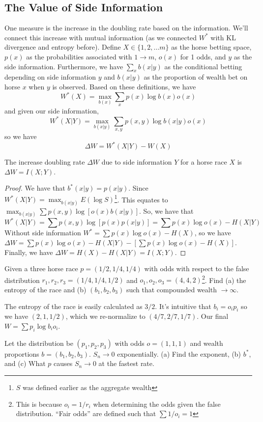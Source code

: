 \documentclass[11pt]{article}
\theoremstyle{definition}
\begin{document}
\subsection{The Value of Side Information}

One measure is the increase in the doubling rate based on the information. We'll connect this increase with mutual information (as we connected $W^*$ with KL divergence and entropy before). Define $X \in \{1, 2, \dots m \}$ as the horse betting space, $p(x)$ as the probabilities associated with $1 \rightarrow m$, $o(x)$ for 1 odds, and $y$ as the side information. Furthermore, we have $\sum_x b(x|y)$ as the conditional betting depending on side information $y$ and $b(x|y)$ as the proportion of wealth bet on horse $x$ when $y$ is observed. Based on these definitions, we have $$W^*(X) = \max_{b(x)} \sum_x p(x) \log b(x) o(x)$$and given our side information, $$W^*(X|Y) = \max_{b(x|y)} \sum_{x, y} p(x, y) \log b(x|y) o(x)$$so we have $$\Delta W = W^*(X|Y) - W(X)$$

\theorem The increase doubling rate $\Delta W$ due to side information $Y$ for a horse race $X$ is $\Delta W = I(X; Y).$

\begin{proof}
We have that $b^*(x|y) = p(x|y)$. Since $W^*(X|Y) = \max_{b(x|y)} E(\log S)$\footnote{$S$ was defined earlier as the aggregate wealth}. This equates to $\max_{b(x|y)} \sum p(x, y) \log [o(x) b(x|y)]$. So, we have that $$W^*(X|Y) = \sum p(x,y) \log [p(x) p(x|y)] = \sum p(x) \log o(x) - H(X|Y)$$Without side information $W^* = \sum p(x) \log o(x) - H(X)$, so we have $\Delta W = \sum p(x) \log o(x) - H(X|Y) - [\sum p(x) \log o(x) - H(X)]$. Finally, we have $\Delta W = H(X) - H(X|Y) = I(X;Y)$.
\end{proof}

\example Given a three horse race $p = (1/2, 1/4, 1/4)$ with odds with respect to the false distribution $r_1, r_2, r_3 = (1/4, 1/4, 1/2)$ and $o_1, o_2, o_3 = (4, 4, 2)$\footnote{This is because $o_i = 1/r_i$ when determining the odds given the false distribution. ``Fair odds'' are defined such that $\sum 1/o_i = 1$}. Find (a) the entropy of the race and (b) $(b_1, b_2, b_3)$ such that compounded wealth $\rightarrow \infty$. 

The entropy of the race is easily calculated as $3/2$. It's intuitive that $b_i = o_i p_i$ so we have $(2, 1, 1/2)$, which we re-normalize to $(4/7, 2/7, 1/7)$. Our final $W = \sum p_i \log b_i o_i$. 

\example Let the distribution be $(p_1, p_2, p_3)$ with odds $o = (1, 1, 1)$ and wealth proportions $b = (b_1, b_2, b_3)$. $S_n \rightarrow 0$ exponentially. (a) Find the exponent, (b) $b^*$, and (c) What $p$ causes $S_n \rightarrow 0$ at the fastest rate. 
\end{document}
